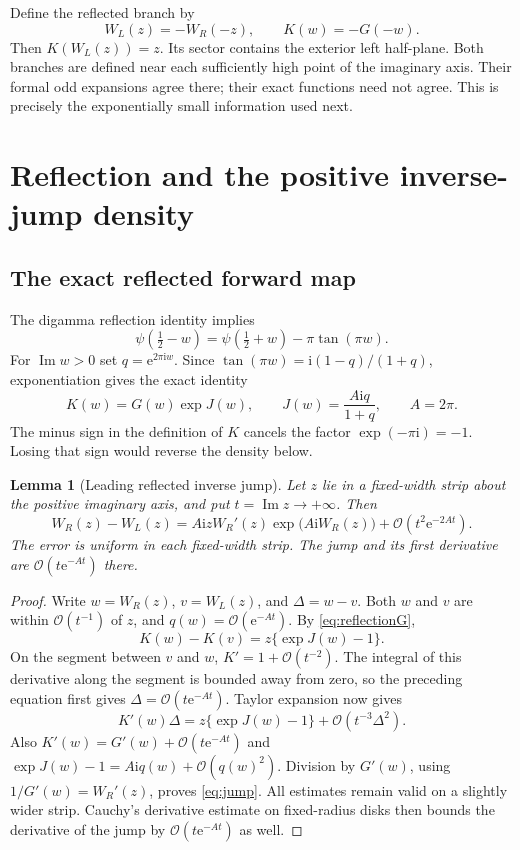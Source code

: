 \documentclass[11pt,a4paper]{article}
\newtheorem{lemma}[lemma]{Lemma}
\theoremstyle{definition}
\numberwithin{equation}{section}
\newcommand{\ii}{\mathrm{i}}
\newcommand{\ee}{\mathrm{e}}
\newcommand{\Oh}{\mathcal O}
\begin{document}
Define the reflected branch by
\begin{equation}
 W_L(z)=-W_R(-z),\qquad K(w)=-G(-w).
 \label{eq:left}
\end{equation}
Then $K(W_L(z))=z$. Its sector contains the exterior left half-plane.
Both branches are defined near each sufficiently high point of the
imaginary axis. Their formal odd expansions agree there; their exact
functions need not agree. This is precisely the exponentially small
information used next.

\section{Reflection and the positive inverse-jump density}
\label{sec:density}

\subsection{The exact reflected forward map}
The digamma reflection identity \cite{dlmf55} implies
\begin{equation}
 \psi(\tfrac12-w)=\psi(\tfrac12+w)-\pi\tan(\pi w).
 \label{eq:reflectionpsi}
\end{equation}
For $\operatorname{Im}w>0$ set $q=\ee^{2\pi\ii w}$. Since
$\tan(\pi w)=\ii(1-q)/(1+q)$, exponentiation gives the exact identity
\begin{equation}
 K(w)=G(w)\exp J(w),\qquad
 J(w)=\frac{A\ii q}{1+q},\qquad A=2\pi.
 \label{eq:reflectionG}
\end{equation}
The minus sign in the definition of $K$ cancels the factor
$\exp(-\pi\ii)=-1$. Losing that sign would reverse the density below.

\begin{lemma}[Leading reflected inverse jump]
\label{lem:jump}
Let $z$ lie in a fixed-width strip about the positive imaginary axis,
and put $t=\operatorname{Im}z\to+\infty$. Then
\begin{equation}
 W_R(z)-W_L(z)
 =A\ii zW_R'(z)\exp\bigl(A\ii W_R(z)\bigr)
      +\Oh(t^2\ee^{-2At}).
 \label{eq:jump}
\end{equation}
The error is uniform in each fixed-width strip. The jump and its first
derivative are $\Oh(t\ee^{-At})$ there.
\end{lemma}
\begin{proof}
Write $w=W_R(z)$, $v=W_L(z)$, and $\Delta=w-v$. Both $w$ and $v$
are within $\Oh(t^{-1})$ of $z$, and $q(w)=\Oh(\ee^{-At})$.
By \eqref{eq:reflectionG},
\[
 K(w)-K(v)=z\{\exp J(w)-1\}.
\]
On the segment between $v$ and $w$, $K'=1+\Oh(t^{-2})$.
The integral of this derivative along the segment is bounded away from
zero, so the preceding equation first gives
$\Delta=\Oh(t\ee^{-At})$. Taylor expansion now gives
\[
 K'(w)\Delta=z\{\exp J(w)-1\}
              +\Oh(t^{-3}\Delta^2).
\]
Also $K'(w)=G'(w)+\Oh(t\ee^{-At})$ and
$\exp J(w)-1=A\ii q(w)+\Oh(q(w)^2)$.
Division by $G'(w)$, using $1/G'(w)=W_R'(z)$, proves
\eqref{eq:jump}. All estimates remain valid on a slightly wider strip.
Cauchy's derivative estimate on fixed-radius disks then bounds the
derivative of the jump by $\Oh(t\ee^{-At})$ as well.
\end{proof}
\end{document}
